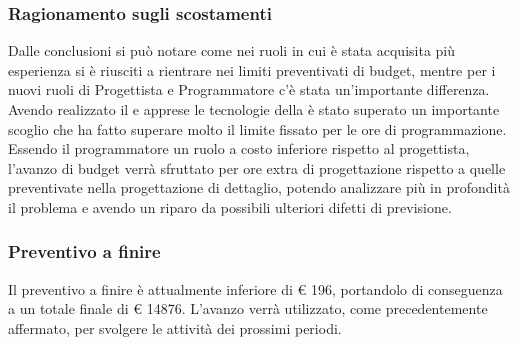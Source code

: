 \subsubsection{Ragionamento sugli scostamenti}
Dalle conclusioni si può notare come nei ruoli in cui è stata acquisita più esperienza si è riusciti a rientrare nei limiti preventivati di budget, mentre per i nuovi ruoli di Progettista e Programmatore c'è stata un'importante differenza.
Avendo realizzato il  e apprese le tecnologie della  è stato superato un importante scoglio che ha fatto superare molto il limite fissato per le ore di programmazione.
Essendo il programmatore un ruolo a costo inferiore rispetto al progettista, l'avanzo di budget verrà sfruttato per ore extra di progettazione rispetto a quelle preventivate nella progettazione di dettaglio, potendo analizzare più in profondità il problema
e avendo un riparo da possibili ulteriori difetti di previsione.

\subsubsection{Preventivo a finire}
Il preventivo a finire è attualmente inferiore di \euro{} 196, portandolo di conseguenza a un totale finale di \euro{} 14876. L'avanzo verrà utilizzato, come precedentemente affermato, per svolgere le attività dei prossimi periodi.